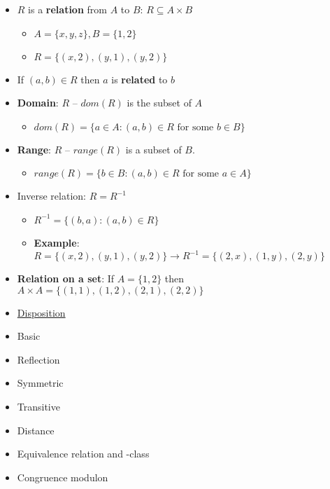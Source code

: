 \documentclass[english,10pt,a4paper]{article}
\begin{document}
\begin{minipage}{0.7\linewidth}
\begin{theo}[Basic] 
\begin{itemize}
\item $R$ is a \textbf{relation} from $A$ to $B$: $R \subseteq A \times B$
\begin{itemize}
\item $A=\{x,y,z\}, B=\{1,2\}$
\item[] $R=\{(x,2),(y,1), (y,2) \}$
\end{itemize}
\item If $(a,b) \in R$ then $a$ is \textbf{related} to $b$
\item \textbf{Domain}: $R$ -- $dom(R)$ is the subset of $A$
\begin{itemize}
\item $dom(R)=\{a \in A: (a,b) \in R \text{ for some } b \in B\}$
\end{itemize}
\item \textbf{Range}: $R$ -- $range(R)$ is a subset of $B$.
\begin{itemize}
\item $range(R)=\{b \in B: (a,b) \in R \text{ for some } a \in A\}$
\end{itemize}
\item Inverse relation: $R = R^{-1}$
\begin{itemize}
\item $R^{-1} = \{(b,a):(a,b) \in R\}$
\item \textbf{Example}: $R=\{(x,2),(y,1),(y,2)\} \rightarrow R^{-1}=\{(2,x),(1,y),(2,y)\}$
\end{itemize}
\item \textbf{Relation on a set}: If $A=\{1,2\}$ then $A \times A = \{(1,1),(1,2),(2,1),(2,2)\}$
\end{itemize}
\end{theo}
\end{minipage}
\hspace{0.1cm}
\begin{minipage}{0.25\linewidth}
\begin{itemize}
\item[] \underline{Disposition}
\item Basic
\item Reflection
\item Symmetric
\item Transitive
\item Distance
\item Equivalence relation and -class
\item Congruence modulon
\end{itemize}
\end{minipage}
\end{document}
